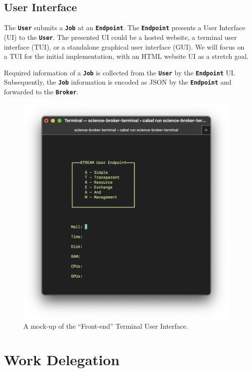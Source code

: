\documentclass{ReportCUNY}
\newcommand{\KeyWord}[1]{\textbf{\texttt{#1}}}
\begin{document}
\subsection{User Interface}

The \KeyWord{User} submits a \KeyWord{Job} at an \KeyWord{Endpoint}.
The \KeyWord{Endpoint} presents a User Interface (UI) to the \KeyWord{User}.
The presented UI could be a hosted website, a terminal user interface (TUI), or a standalone graphical user interface (GUI).
We will focus on a TUI for the initial implementation, with an HTML website UI as a stretch goal.

Required information of a \KeyWord{Job} is collected from the \KeyWord{User} by the \KeyWord{Endpoint} UI.
Subsequently, the \KeyWord{Job} information is encoded as JSON by the \KeyWord{Endpoint} and forwarded to the \KeyWord{Broker}.

\begin{figure}
\includegraphics[width=\textwidth]{Frontend-Mockup.png}
\caption{A mock-up of the ``Front-end'' Terminal User Interface.}
\end{figure}


\section{Work Delegation}
\end{document}
